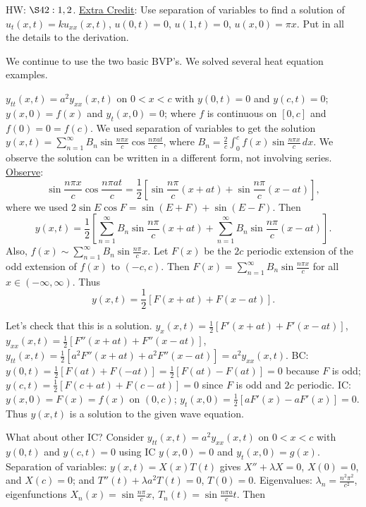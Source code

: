 \documentclass[]{article}
\begin{document}
HW: $\S42: 1,2$. \underline{Extra Credit}: Use separation of variables to find a solution of $u_t(x,t) = k u_{xx} (x,t)$, $u(0,t)=0$, $u(1,t)=0$, $u(x,0)=\pi x$. Put in all the details to the derivation.

We continue to use the two basic BVP's.
We solved several heat equation examples.

\begin{example}
	 $y_{tt}(x,t) = a^2 y_{xx}(x,t)$ on $0<x<c$ with $y(0,t)=0$ and $y(c,t)=0$; $y(x,0)=f(x)$ and $y_t(x,0)=0$; where $f$ is continuous on $[0,c]$ and $f(0)=0=f(c)$. We used separation of variables to get the solution $y(x,t)=\sum_{n=1}^\infty B_n \sin{\frac{n\pi x}{c}} \cos{\frac{n\pi a t}{c}}$, where $B_n = \frac{2}{c} \int_0^c f(x) \sin{\frac{n\pi x}{c}}\, dx$.
	We observe the solution can be written in a different form, not involving series.
	\underline{Observe}: $$\sin{\frac{n\pi x}{c}}\cos{\frac{n\pi a t}{c}} = \frac{1}{2} \left[ \sin{\frac{n\pi}{c}(x+at)} + \sin{\frac{n\pi}{c}(x-at)} \right],$$ where we used $2\sin{E}\cos{F} = \sin{(E+F)}+\sin{(E-F)}$. Then
	$$y(x,t) = \frac{1}{2} \left[ \sum_{n=1}^\infty B_n \sin{\frac{n\pi}{c}(x+at)} + \sum_{n=1}^\infty B_n \sin{\frac{n\pi}{c}(x-at)} \right].$$
	Also, $f(x) \sim \sum_{n=1}^\infty B_n \sin{\frac{n\pi}{c}x}$.
	Let $F(x)$ be the $2c$ periodic extension of the odd extension of $f(x)$ to $(-c,c)$. Then $F(x) = \sum_{n=1}^\infty B_n \sin{\frac{n\pi x}{c}}$ for all $x\in(-\infty,\infty)$.
	Thus $$y(x,t) = \frac{1}{2} \left[ F(x+at) + F(x-at) \right].$$

	Let's check that this is a solution. $y_x(x,t) = \frac{1}{2} \left[ F'(x+at) + F'(x-at) \right]$, $y_{xx}(x,t) = \frac{1}{2} [ F''(x+at) + F''(x-at)]$, $y_{tt}(x,t) = \frac{1}{2} [a^2 F''(x+at) + a^2 F''(x-at)] = a^2 y_{xx}(x,t)$.
	BC: $y(0,t) = \frac{1}{2} [ F(at) + F(-at)] = \frac{1}{2} [ F(at)-F(at)] = 0$ because $F$ is odd; $y(c,t) = \frac{1}{2} [F(c+at) + F(c-at)] = 0$ since $F$ is odd and $2c$ periodic. IC: $y(x,0) = F(x) = f(x)$ on $(0,c)$; $y_t(x,0) = \frac{1}{2} [ aF'(x) - aF'(x) ] =0$.
	Thus $y(x,t)$ is a solution to the given wave equation.
\end{example}
What about other IC? Consider $y_{tt}(x,t) = a^2 y_{xx}(x,t)$ on $0<x<c$ with $y(0,t)$ and $y(c,t)=0$ using IC $y(x,0)=0$ and $y_t(x,0)=g(x)$.
Separation of variables: $y(x,t) = X(x)T(t)$ gives $X''+\lambda X=0$, $X(0)=0$, and $X(c)=0$; and $T''(t) + \lambda a^2 T(t) = 0$, $T(0)=0$.
Eigenvalues: $\lambda_n = \frac{n^2\pi^2}{c^2}$, eigenfunctions $X_n(x)=\sin{\frac{n\pi}{c}x}$, $T_n(t) = \sin{\frac{n\pi a}{c}t}$. Then
\end{document}
